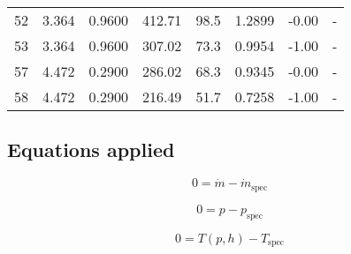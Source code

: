 \documentclass[]{article}
\begin{document}
\begin{longtable}[H]{lrrrrrrr}
52    &                                                     3.364 &                                             0.9600 &                     412.71 &                                                       98.5 &                      1.2899 &                                                       -0.00 &                                                                                           - \\
53    &                                                     3.364 &                                             0.9600 &                     307.02 &                                                       73.3 &                      0.9954 &                                                       -1.00 &                                                                                           - \\
57    &                                                     4.472 &                                             0.2900 &                     286.02 &                                                       68.3 &                      0.9345 &                                                       -0.00 &                                                                                           - \\
58    &                                                     4.472 &                                             0.2900 &                     216.49 &                                                       51.7 &                      0.7258 &                                                       -1.00 &                                                                                           - \\
\end{longtable}
\subsection{Equations applied}

\begin{equation}
\label{eq:Connection_mass flow}
0 = \dot{m} - \dot{m}_\mathrm{spec}
\end{equation}

\begin{equation}
\label{eq:Connection_pressure}
0 = p - p_\mathrm{spec}
\end{equation}

\begin{equation}
\label{eq:Connection_temperature}
0 = T \left(p, h \right) - T_\mathrm{spec}
\end{equation}
\end{document}
